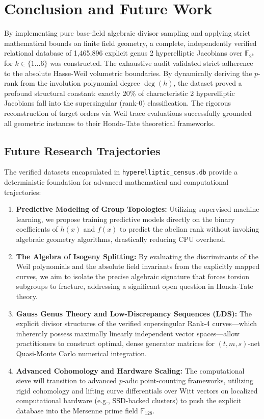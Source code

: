 \documentclass[letterpaper, 11pt]{article}
\begin{document}
	\section{Conclusion and Future Work}
	By implementing pure base-field algebraic divisor sampling and applying strict mathematical bounds on finite field geometry, a complete, independently verified relational database of 1,465,896 explicit genus 2 hyperelliptic Jacobians over $\mathbb{F}_{2^k}$ for $k \in \{1 \dots 6\}$ was constructed. The exhaustive audit validated strict adherence to the absolute Hasse-Weil volumetric boundaries. By dynamically deriving the $p$-rank from the involution polynomial degree $\deg(h)$, the dataset proved a profound structural constant: exactly 20\% of characteristic 2 hyperelliptic Jacobians fall into the supersingular (rank-0) classification. The rigorous reconstruction of target orders via Weil trace evaluations successfully grounded all geometric instances to their Honda-Tate theoretical frameworks.
	
	\subsection{Future Research Trajectories}
	The verified datasets encapsulated in \texttt{hyperelliptic\_census.db} provide a deterministic foundation for advanced mathematical and computational trajectories:
	
	\begin{enumerate}
		\item \textbf{Predictive Modeling of Group Topologies:} Utilizing supervised machine learning, we propose training predictive models directly on the binary coefficients of $h(x)$ and $f(x)$ to predict the abelian rank without invoking algebraic geometry algorithms, drastically reducing CPU overhead.
		\item \textbf{The Algebra of Isogeny Splitting:} By evaluating the discriminants of the Weil polynomials and the absolute field invariants from the explicitly mapped curves, we aim to isolate the precise algebraic signature that forces torsion subgroups to fracture, addressing a significant open question in Honda-Tate theory.
		\item \textbf{Gauss Genus Theory and Low-Discrepancy Sequences (LDS):} The explicit divisor structures of the verified supersingular Rank-4 curves---which inherently possess maximally linearly independent vector spaces---allow practitioners to construct optimal, dense generator matrices for $(t,m,s)$-net Quasi-Monte Carlo numerical integration.
		\item \textbf{Advanced Cohomology and Hardware Scaling:} The computational sieve will transition to advanced $p$-adic point-counting frameworks, utilizing rigid cohomology and lifting curve differentials over Witt vectors on localized computational hardware (e.g., SSD-backed clusters) to push the explicit database into the Mersenne prime field $\mathbb{F}_{128}$.
	\end{enumerate}
	
\end{document}
